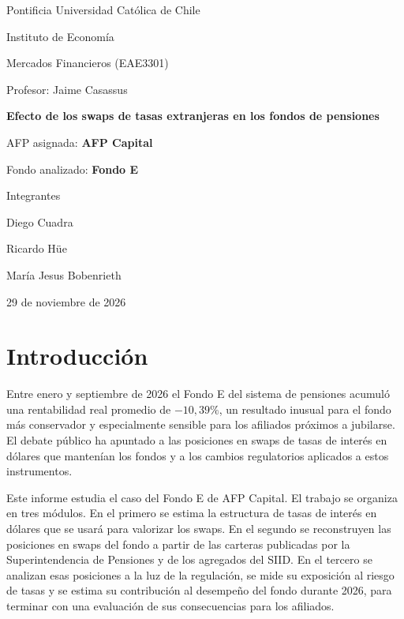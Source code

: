 \documentclass[11pt,letterpaper]{article}
\begin{document}
\begin{titlepage}
\centering
{\large Pontificia Universidad Católica de Chile\par Instituto de Economía\par}
\vspace{0.4cm}
{\large Mercados Financieros (EAE3301)\par Profesor: Jaime Casassus\par}
\vspace{3.5cm}
{\LARGE\bfseries Efecto de los swaps de tasas extranjeras en los fondos de pensiones\par}
\vspace{1.2cm}
{\Large AFP asignada: \textbf{AFP Capital}\par Fondo analizado: \textbf{Fondo E}\par}
\vspace{3.5cm}
{\large Integrantes\par}
\vspace{0.3cm}
{\large Diego Cuadra\par Ricardo Hüe\par María Jesus Bobenrieth\par}
\vfill
{\large 29 de noviembre de 2026\par}
\end{titlepage}

\tableofcontents
\newpage

\section{Introducción}

Entre enero y septiembre de 2026 el Fondo E del sistema de pensiones acumuló una
rentabilidad real promedio de $-10{,}39\%$, un resultado inusual para el fondo más
conservador y especialmente sensible para los afiliados próximos a jubilarse. El debate
público ha apuntado a las posiciones en swaps de tasas de interés en dólares que
mantenían los fondos y a los cambios regulatorios aplicados a estos instrumentos.

Este informe estudia el caso del Fondo E de AFP Capital. El trabajo se organiza en tres
módulos. En el primero se estima la estructura de tasas de interés en dólares que se
usará para valorizar los swaps. En el segundo se reconstruyen las posiciones en swaps
del fondo a partir de las carteras publicadas por la Superintendencia de Pensiones y de
los agregados del SIID. En el tercero se analizan esas posiciones a la luz de la
regulación, se mide su exposición al riesgo de tasas y se estima su contribución al
desempeño del fondo durante 2026, para terminar con una evaluación de sus consecuencias
para los afiliados.
\end{document}
